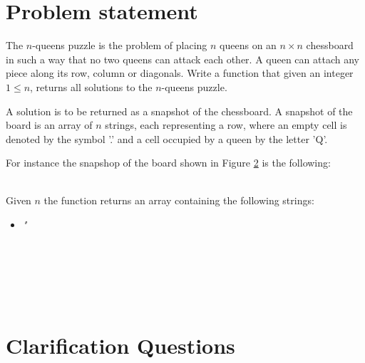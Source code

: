 \section{Problem statement}
\begin{exercise}
\label{example:nqueens:exercice1}
The $n$-queens puzzle is the problem of placing $n$ queens on an $n \times n$ chessboard in such a
way that no two queens can attack each other. A queen can attach any piece along its row, column or
diagonals. Write a function that given an integer $1 \leq n$, returns all solutions to the
$n$-queens puzzle.

A solution is to be returned as a snapshot of the chessboard. A snapshot of the board is an array of
$n$ strings, each representing a row, where an empty cell is denoted by the symbol '.' and a cell
occupied by a queen by the letter 'Q'.

For instance the snapshop of the board shown in Figure \ref{} is the following: 

	\begin{example}
		\label{example:nqueens:example1}
		\hfill \\
		Given $n$ the function returns an array containing the following strings:
		\begin{itemize}
			\item \textit{"}
		\end{itemize}
		
	\end{example}

	\begin{example}
		\label{example:nqueens:example2}
		\hfill \
		
	\end{example}

	\begin{example}
		\hfill \
	
	\label{ex:nqueens:example3}
	\end{example}

	\begin{example}
		\hfill \

	\label{ex:nqueens:example4}	
	\end{example}
\end{exercise}

\section{Clarification Questions}

\begin{QandA}
	\item 
	\begin{answered}
		\textit{}
	\end{answered}
	
\end{QandA}

